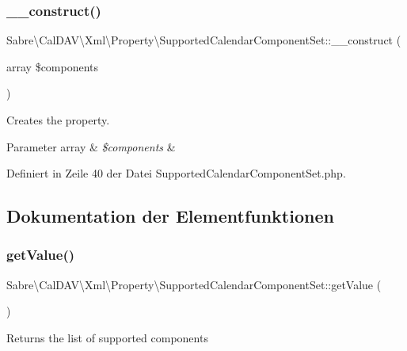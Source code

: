\subsubsection{\texorpdfstring{\+\_\+\+\_\+construct()}{\_\_construct()}}
{\footnotesize\ttfamily Sabre\textbackslash{}\+Cal\+D\+A\+V\textbackslash{}\+Xml\textbackslash{}\+Property\textbackslash{}\+Supported\+Calendar\+Component\+Set\+::\+\_\+\+\_\+construct (\begin{DoxyParamCaption}\item[{array}]{\$components }\end{DoxyParamCaption})}

Creates the property.


\begin{DoxyParams}[1]{Parameter}
array & {\em \$components} & \\
\hline
\end{DoxyParams}


Definiert in Zeile 40 der Datei Supported\+Calendar\+Component\+Set.\+php.



\subsection{Dokumentation der Elementfunktionen}
\mbox{\label{class_sabre_1_1_cal_d_a_v_1_1_xml_1_1_property_1_1_supported_calendar_component_set_a11c088d0280ee3c07bbff8232a950c19}} 
\subsubsection{\texorpdfstring{get\+Value()}{getValue()}}
{\footnotesize\ttfamily Sabre\textbackslash{}\+Cal\+D\+A\+V\textbackslash{}\+Xml\textbackslash{}\+Property\textbackslash{}\+Supported\+Calendar\+Component\+Set\+::get\+Value (\begin{DoxyParamCaption}{ }\end{DoxyParamCaption})}

Returns the list of supported components

